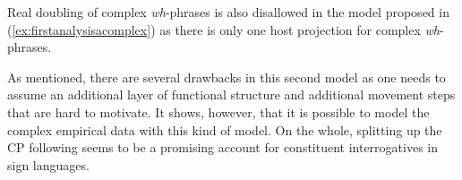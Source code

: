 \begin{exe}
\begin{multicols}{2}
\begin{xlist}
\begin{adjustbox}{max width=0.46\textwidth}
\begin{tikzpicture}[baseline]
\end{tikzpicture}
\end{adjustbox}
\ex\label{ex:firstanalysisacomplexb}
\begin{adjustbox}{max width=0.46\textwidth}
\end{adjustbox}
\end{xlist}
\end{multicols}
\end{exe}


\noindent Real doubling of complex \textit{wh}-phrases is also disallowed in the model proposed in (\ref{ex:firstanalysisacomplex}) as there is only one host projection for complex \textit{wh}-phrases. 

As mentioned, there are several drawbacks in this second model as one needs to assume an additional layer of functional structure and additional movement steps that are hard to motivate. It shows, however, that it is possible to model the complex empirical data with this kind of model. On the whole, splitting up the CP following \citet{van2010complex, van2012you} seems to be a promising account for constituent interrogatives in sign languages. 

